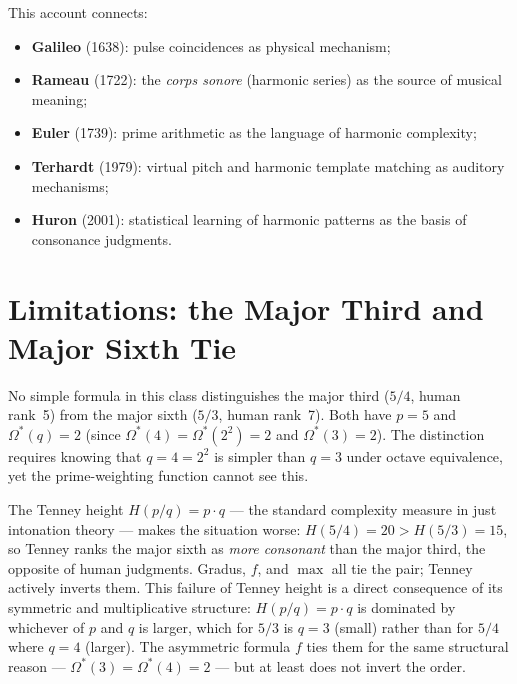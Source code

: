 \documentclass[11pt,a4paper]{article}
\newcommand{\Os}{\Omega^{*}}
\begin{document}
\medskip\noindent
This account connects:
\begin{itemize}
  \item \textbf{Galileo} (1638): pulse coincidences as physical mechanism;
  \item \textbf{Rameau} (1722): the \emph{corps sonore} (harmonic series) as
        the source of musical meaning;
  \item \textbf{Euler} (1739): prime arithmetic as the language of harmonic
        complexity;
  \item \textbf{Terhardt} (1979): virtual pitch and harmonic template matching
        as auditory mechanisms;
  \item \textbf{Huron} (2001): statistical learning of harmonic patterns as
        the basis of consonance judgments.
\end{itemize}


\section{Limitations: the Major Third and Major Sixth Tie}

No simple formula in this class distinguishes the major third ($5/4$, human
rank~5) from the major sixth ($5/3$, human rank~7). Both have $p = 5$ and
$\Os(q) = 2$ (since $\Os(4) = \Os(2^2) = 2$ and $\Os(3) = 2$). The
distinction requires knowing that $q = 4 = 2^2$ is simpler than $q = 3$
under octave equivalence, yet the prime-weighting function cannot see this.

The Tenney height $H(p/q) = p \cdot q$ \cite{tenney1988} --- the standard
complexity measure in just intonation theory --- makes the situation worse:
$H(5/4) = 20 > H(5/3) = 15$, so Tenney ranks the major sixth as
\emph{more consonant} than the major third, the opposite of human judgments.
Gradus, $f$, and $\max$ all tie the pair; Tenney actively inverts them.
This failure of Tenney height is a direct consequence of its symmetric and
multiplicative structure: $H(p/q) = p \cdot q$ is dominated by whichever of
$p$ and $q$ is larger, which for $5/3$ is $q = 3$ (small) rather than for
$5/4$ where $q = 4$ (larger). The asymmetric formula $f$ ties them for the
same structural reason --- $\Os(3) = \Os(4) = 2$ --- but at least does not
invert the order.
\end{document}
